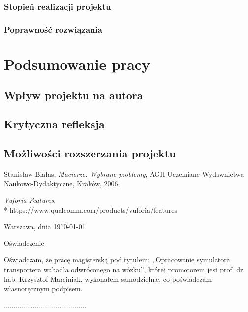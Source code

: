 \documentclass[12pt, oneside]{report}
\theoremstyle{definition}
\begin{document}
\subsection{Stopień realizacji projektu}
\subsection{Poprawność rozwiązania}

	
\newpage
\chapter{Podsumowanie pracy}
\section{Wpływ projektu na autora}
\section{Krytyczna refleksja}
\section{Możliwości rozszerzania projektu}

	
\pagestyle{plain}
\begin{thebibliography}{11}

 Stanisław Białas, \emph{Macierze. Wybrane problemy}, AGH Uczelniane Wydawnictwa Naukowo-Dydaktyczne, Kraków, 2006.

 \emph{Vuforia Features},
\\*
https://www.qualcomm.com/products/vuforia/features

\end{thebibliography}


\clearpage
\pagestyle{empty}
\noindent Warszawa, dnia \today
\vspace{5cm}
\begin{center}
	\LARGE{Oświadczenie}
\end{center}
Oświadczam, że pracę magisterską pod tytułem: ,,Opracowanie symulatora transportera wahadła odwróconego na wózku'', której promotorem jest prof. dr hab. Krzysztof Marciniak, wykonałem samodzielnie, co poświadczam własnoręcznym podpisem.
\vspace{2cm}
\begin{flushright}
...........................................
\end{flushright}
\end{document}
